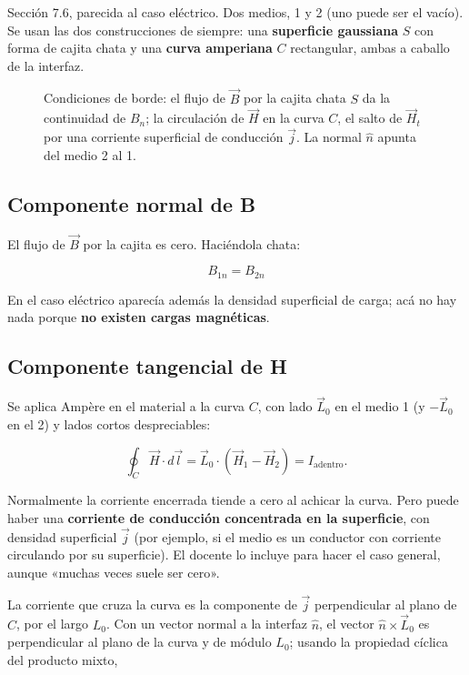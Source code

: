 \documentclass[12pt,a4paper]{article}
\begin{document}
Sección 7.6, parecida al caso eléctrico. Dos medios, 1 y 2 (uno puede ser el
vacío). Se usan las dos construcciones de siempre: una \textbf{superficie gaussiana}
$S$ con forma de cajita chata y una \textbf{curva amperiana} $C$ rectangular, ambas
a caballo de la interfaz.

\begin{figure}[H]
  \centering
  
  \caption{Condiciones de borde: el flujo de $\vec B$ por la cajita chata $S$ da la continuidad de $B_n$; la circulación de $\vec H$ en la curva $C$, el salto de $\vec H_t$ por una corriente superficial de conducción $\vec j$. La normal $\hat n$ apunta del medio 2 al 1.}
\end{figure}

\subsection{Componente normal de B}

El flujo de $\vec B$ por la cajita es cero. Haciéndola chata:

\begin{keybox}
\[
\boxed{\ B_{1n} = B_{2n}\ }
\]
\end{keybox}

En el caso eléctrico aparecía además la densidad superficial de carga; acá no
hay nada porque \textbf{no existen cargas magnéticas}.

\subsection{Componente tangencial de H}

Se aplica Ampère en el material a la curva $C$, con lado $\vec L_0$ en el medio
1 (y $-\vec L_0$ en el 2) y lados cortos despreciables:

\[
\oint_C \vec H\cdot d\vec l = \vec L_0\cdot(\vec H_1-\vec H_2) = I_{\text{adentro}} .
\]

Normalmente la corriente encerrada tiende a cero al achicar la curva. Pero
puede haber una \textbf{corriente de conducción concentrada en la superficie}, con
densidad superficial $\vec j$ (por ejemplo, si el medio es un conductor con
corriente circulando por su superficie). El docente lo incluye para hacer el
caso general, aunque «muchas veces suele ser cero».

La corriente que cruza la curva es la componente de $\vec j$ perpendicular al
plano de $C$, por el largo $L_0$. Con un vector normal a la interfaz
$\hat n$, el vector $\hat n\times\vec L_0$ es perpendicular al plano de la
curva y de módulo $L_0$; usando la propiedad cíclica del producto mixto,
\end{document}
